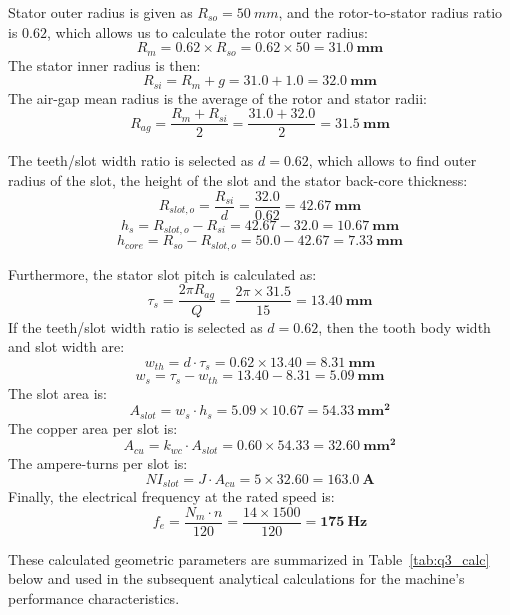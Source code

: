 \documentclass[12pt, a4paper]{article}
\begin{document}
Stator outer radius is given as $R_{so} = \SI{50}{mm}$, and the rotor-to-stator radius ratio is $0.62$, which allows us to calculate the rotor outer radius:
\[R_m = 0.62 \times R_{so} = 0.62 \times 50 = \mathbf{\SI{31.0}{mm}}\]
The stator inner radius is then:
\[R_{si} = R_m + g = 31.0 + 1.0 = \mathbf{\SI{32.0}{mm}}\]
The air-gap mean radius is the average of the rotor and stator radii:
\[R_{ag} = \frac{R_m + R_{si}}{2} = \frac{31.0 + 32.0}{2} = \mathbf{\SI{31.5}{mm}}\]

The teeth/slot width ratio is selected as $d = 0.62$, which allows to find outer radius of the slot, the height of the slot and the stator back-core thickness:
\[R_{slot,o} = \frac{R_{si}}{d} = \frac{32.0}{0.62} = \mathbf{\SI{42.67}{mm}}\]
\[h_s = R_{slot,o} - R_{si} = 42.67 - 32.0 = \mathbf{\SI{10.67}{mm}}\]
\[h_{core} = R_{so} - R_{slot,o} = 50.0 - 42.67 = \mathbf{\SI{7.33}{mm}}\]

Furthermore, the stator slot pitch is calculated as:
\[\tau_s = \frac{2\pi R_{ag}}{Q} = \frac{2\pi \times 31.5}{15} = \mathbf{\SI{13.40}{mm}}\]
If the teeth/slot width ratio is selected as $d = 0.62$, then the tooth body width and slot width are:
\[w_{th} = d \cdot \tau_s = 0.62 \times 13.40 = \mathbf{\SI{8.31}{mm}}\]
\[w_s = \tau_s - w_{th} = 13.40 - 8.31 = \mathbf{\SI{5.09}{mm}}\]
The slot area is:
\[A_{slot} = w_s \cdot h_s = 5.09 \times 10.67 = \mathbf{\SI{54.33}{mm^2}}\]
The copper area per slot is:
\[A_{cu} = k_{wc} \cdot A_{slot} = 0.60 \times 54.33 = \mathbf{\SI{32.60}{mm^2}}\]
The ampere-turns per slot is:
\[NI_{slot} = J \cdot A_{cu} = 5 \times 32.60 = \mathbf{\SI{163.0}{A}}\]
Finally, the electrical frequency at the rated speed is:
\[f_e = \frac{N_m \cdot n}{120} = \frac{14 \times 1500}{120} = \mathbf{\SI{175}{Hz}}\]

These calculated geometric parameters are summarized in Table~\ref{tab:q3_calc} below and used in the subsequent analytical calculations for the machine's performance characteristics.
\end{document}
